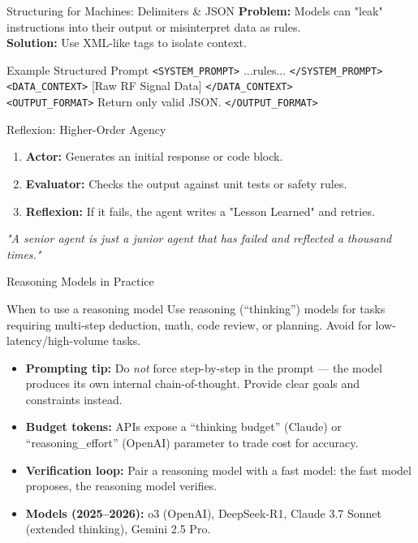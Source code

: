 \documentclass{beamer}       %
\begin{document}
\begin{frame}{Structuring for Machines: Delimiters \& JSON}
    \textbf{Problem:} Models can "leak" instructions into their output or misinterpret data as rules. \\
    \textbf{Solution:} Use XML-like tags to isolate context.
    
    \begin{exampleblock}{Example Structured Prompt}
        \texttt{<SYSTEM\_PROMPT>} ...rules... \texttt{</SYSTEM\_PROMPT>} \\
        \texttt{<DATA\_CONTEXT>} [Raw RF Signal Data] \texttt{</DATA\_CONTEXT>} \\
        \texttt{<OUTPUT\_FORMAT>} Return only valid JSON. \texttt{</OUTPUT\_FORMAT>}
    \end{exampleblock}
\end{frame}

\begin{frame}{Reflexion: Higher-Order Agency}
    \begin{enumerate}
        \item \textbf{Actor:} Generates an initial response or code block.
        \item \textbf{Evaluator:} Checks the output against unit tests or safety rules.
        \item \textbf{Reflexion:} If it fails, the agent writes a "Lesson Learned" and retries.
    \end{enumerate}
    \centering
    \textit{"A senior agent is just a junior agent that has failed and reflected a thousand times."}
\end{frame}

\begin{frame}{Reasoning Models in Practice}
    \begin{block}{When to use a reasoning model}
        Use reasoning (``thinking'') models for tasks requiring multi-step deduction, math, code review, or planning. Avoid for low-latency/high-volume tasks.
    \end{block}
    \vspace{0.2cm}
    \begin{itemize}
        \item \textbf{Prompting tip:} Do \emph{not} force step-by-step in the prompt --- the model produces its own internal chain-of-thought. Provide clear goals and constraints instead.
        \item \textbf{Budget tokens:} APIs expose a ``thinking budget'' (Claude) or ``reasoning\_effort'' (OpenAI) parameter to trade cost for accuracy.
        \item \textbf{Verification loop:} Pair a reasoning model with a fast model: the fast model proposes, the reasoning model verifies.
        \item \textbf{Models (2025--2026):} o3 (OpenAI), DeepSeek-R1, Claude 3.7 Sonnet (extended thinking), Gemini 2.5 Pro.
    \end{itemize}
\end{frame}
\end{document}
